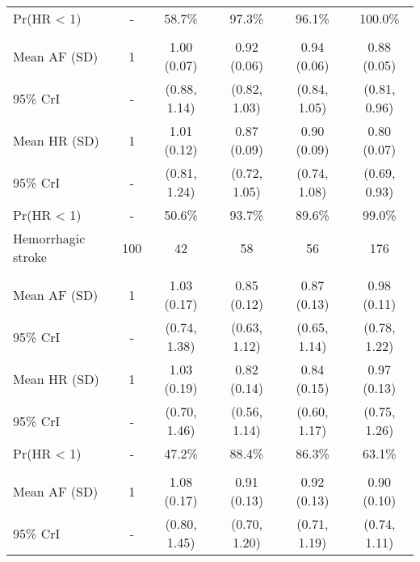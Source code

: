 \documentclass[nutrients,article,submitted,moreauthors,pdftex]{mdpi}
\begin{document}
\begin{table}[H]
{\begin{tabular}[t]{lccccc}
\rowcolor{gray!6}  \hspace{1em}Pr(HR < 1) & - & 58.7\% & 97.3\% & 96.1\% & 100.0\%\\
\addlinespace[0.3em]
\multicolumn{6}{l}{\textbf{Model 2}}\\
\hspace{1em}Mean AF (SD) & 1 & 1.00 (0.07) & 0.92 (0.06) & 0.94 (0.06) & 0.88 (0.05)\\
\rowcolor{gray!6}  \hspace{1em}95\% CrI & - & (0.88, 1.14) & (0.82, 1.03) & (0.84, 1.05) & (0.81, 0.96)\\
\hspace{1em}Mean HR (SD) & 1 & 1.01 (0.12) & 0.87 (0.09) & 0.90 (0.09) & 0.80 (0.07)\\
\rowcolor{gray!6}  \hspace{1em}95\% CrI & - & (0.81, 1.24) & (0.72, 1.05) & (0.74, 1.08) & (0.69, 0.93)\\
\hspace{1em}Pr(HR < 1) & - & 50.6\% & 93.7\% & 89.6\% & 99.0\%\\
\hline
\rowcolor{gray!6}  Hemorrhagic stroke & 100 & 42 & 58 & 56 & 176\\
\addlinespace[0.3em]
\multicolumn{6}{l}{\textbf{Model 0}}\\
\hspace{1em}Mean AF (SD) & 1 & 1.03 (0.17) & 0.85 (0.12) & 0.87 (0.13) & 0.98 (0.11)\\
\rowcolor{gray!6}  \hspace{1em}95\% CrI & - & (0.74, 1.38) & (0.63, 1.12) & (0.65, 1.14) & (0.78, 1.22)\\
\hspace{1em}Mean HR (SD) & 1 & 1.03 (0.19) & 0.82 (0.14) & 0.84 (0.15) & 0.97 (0.13)\\
\rowcolor{gray!6}  \hspace{1em}95\% CrI & - & (0.70, 1.46) & (0.56, 1.14) & (0.60, 1.17) & (0.75, 1.26)\\
\hspace{1em}Pr(HR < 1) & - & 47.2\% & 88.4\% & 86.3\% & 63.1\%\\
\addlinespace[0.3em]
\multicolumn{6}{l}{\textbf{Model 1}}\\
\rowcolor{gray!6}  \hspace{1em}Mean AF (SD) & 1 & 1.08 (0.17) & 0.91 (0.13) & 0.92 (0.13) & 0.90 (0.10)\\
\hspace{1em}95\% CrI & - & (0.80, 1.45) & (0.70, 1.20) & (0.71, 1.19) & (0.74, 1.11)\\

\end{tabular}}
\end{table}
\end{document}

